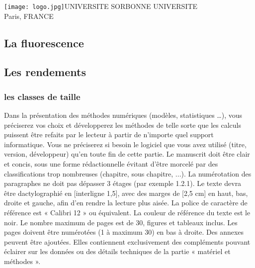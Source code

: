 \documentclass[]{report}
\begin{document}

\begin{titlepage}
\texttt{[image: logo.jpg]}{UNIVERSITE SORBONNE UNIVERSITE\\Paris, FRANCE}

\end{titlepage}


\begin{onehalfspace}


\part{La fluorescence}
\chapter{Les rendements}
\section{les classes de taille}
Dans la présentation des méthodes numériques (modèles, statistiques …), vous préciserez vos choix et
développerez les méthodes de telle sorte que les calculs puissent être refaits par le lecteur à partir de
n’importe quel support informatique. Vous ne préciserez si besoin le logiciel que vous avez utilisé (titre,
version, développeur) qu’en toute fin de cette partie.
Le manuscrit doit être clair et concis, sous une forme rédactionnelle évitant d’être morcelé par des
classifications trop nombreuses (chapitre, sous chapitre, ...). La numérotation des paragraphes ne doit
pas dépasser 3 étages (par exemple 1.2.1).
Le texte devra être dactylographié en [interligne 1,5], avec des marges de [2,5 cm] en haut, bas, droite et
gauche, afin d'en rendre la lecture plus aisée.
La police de caractère de référence est « Calibri 12 » ou équivalent. La couleur de référence du texte est
le noir.
Le nombre maximum de pages est de 30, figures et tableaux inclus. Les pages doivent être numérotées
(1 à maximum 30) en bas à droite.
Des annexes peuvent être ajoutées. Elles contiennent exclusivement des compléments pouvant éclairer
sur les données ou des détails techniques de la partie « matériel et méthodes ».

\end{onehalfspace}
\end{document}
